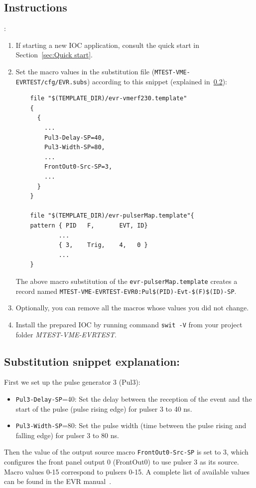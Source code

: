 \documentclass[12pt,a4paper]{article}
\begin{document}
\subsection{Instructions}:
\begin{enumerate}
	\item If starting a new IOC application, consult the quick start in Section~\ref{sec:Quick start}.

	\item Set the macro values in the substitution file (\texttt{MTEST-VME-EVRTEST/cfg/EVR.subs}) according to this snippet (explained in~\ref{sec:explain_pulser}):
\begin{verbatim}
	file "$(TEMPLATE_DIR)/evr-vmerf230.template"
	{
	  {
	    ...
	    Pul3-Delay-SP=40,
	    Pul3-Width-SP=80,
	    ...
	    FrontOut0-Src-SP=3,
	    ...
	  }
	}

	file "$(TEMPLATE_DIR)/evr-pulserMap.template"{
	pattern { PID   F,       EVT, ID}
	        ...
	        { 3,    Trig,    4,   0 }
	        ...
	}
\end{verbatim}
	The above macro substitution of the \texttt{evr-pulserMap.template} creates a record named \texttt{MTEST-VME-EVRTEST-EVR0:Pul\$(PID)-Evt-\$(F)\$(ID)-SP}.
	\item Optionally, you can remove all the macros whose values you did not change. 
	\item Install the prepared IOC by running command \texttt{swit -V} from your project folder \textit{MTEST-VME-EVRTEST}.
\end{enumerate}
\subsection{Substitution snippet explanation:}\label{sec:explain_pulser}

First we set up the pulse generator 3 (Pul3):
\begin{itemize}
	\item \texttt{Pul3-Delay-SP}=40: Set the delay between the reception of the event and the start of the pulse (pulse rising edge) for pulser 3 to 40 ns. 
	\item \texttt{Pul3-Width-SP}=80: Set the pulse width (time between the pulse rising and falling edge) for pulser 3 to 80 ns.
\end{itemize}

Then the value of the output source macro \texttt{FrontOut0-Src-SP} is set to 3, which configures the front panel output 0 (FrontOut0) to use pulser 3 as its source. Macro values 0-15 correspond to pulsers 0-15. A complete list of available values can be found in the EVR manual~\cite{evr_manual}.
\end{document}
